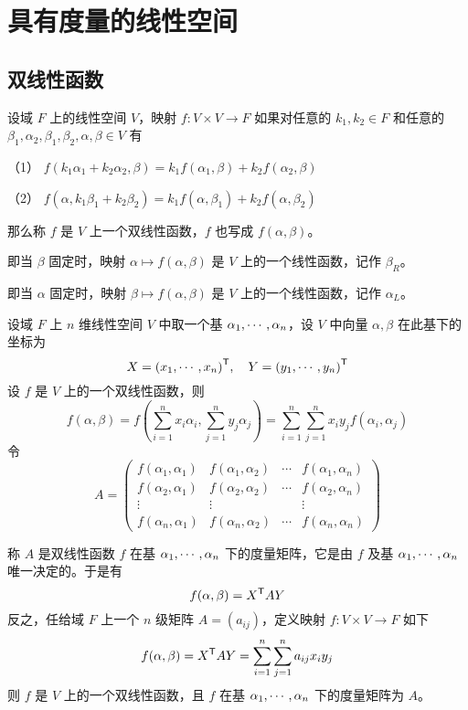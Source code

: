 \chapter{具有度量的线性空间}

\section{双线性函数}

\begin{definition}[双线性函数]
    设域 $F$ 上的线性空间 $V$，映射 $f : V \times V \to F$ 如果对任意的 $k_1,k_2 \in F$ 和任意的 $\beta_1,\alpha_2,\beta_1,\beta_2,\alpha,\beta \in V$ 有

    （1） $f(k_1\alpha_1 + k_2\alpha_2,\beta) = k_1 f(\alpha_1,\beta) + k_2f(\alpha_2,\beta)$

    （2） $f(\alpha,k_1\beta_1 + k_2\beta_2) = k_1 f(\alpha,\beta_1) + k_2f(\alpha,\beta_2)$

    那么称 $f$ 是 $V$ 上一个双线性函数，$f$ 也写成 $f(\alpha,\beta)$。
\end{definition}

即当 $\beta$ 固定时，映射 $\alpha \mapsto f(\alpha,\beta)$ 是 $V$ 上的一个线性函数，记作 $\beta_R$。

即当 $\alpha$ 固定时，映射 $\beta \mapsto f(\alpha,\beta)$ 是 $V$ 上的一个线性函数，记作 $\alpha_L$。

设域 $F$ 上 $n$ 维线性空间 $V$ 中取一个基 $\alpha_1,\cdots,\alpha_n$，设 $V$ 中向量 $\alpha,\beta$ 在此基下的坐标为
\[ X = {(x_1,\cdots,x_n)}^\mathsf{T}, \quad Y = {(y_1,\cdots,y_n)}^\mathsf{T} \]
设 $f$ 是 $V$ 上的一个双线性函数，则
\[ f(\alpha,\beta) = f\left( \sum_{i=1}^n x_i\alpha_i,\sum_{j=1}^ny_j\alpha_j \right) = \sum_{i=1}^n\sum_{j=1}^n x_iy_jf(\alpha_i,\alpha_j) \]
令
\[ A = \left(\begin{matrix}
    f(\alpha_1,\alpha_1) & f(\alpha_1,\alpha_2) & \cdots & f(\alpha_1,\alpha_n)\\
    f(\alpha_2,\alpha_1) & f(\alpha_2,\alpha_2) & \cdots & f(\alpha_2,\alpha_n)\\
    \vdots                 & \vdots                 &        & \vdots                \\
    f(\alpha_n,\alpha_1) & f(\alpha_n,\alpha_2) & \cdots & f(\alpha_n,\alpha_n)
\end{matrix}\right) \]

称 $A$ 是双线性函数 $f$ 在基 $\alpha_1,\cdots,\alpha_n$ 下的度量矩阵，它是由 $f$ 及基 $\alpha_1,\cdots,\alpha_n$ 唯一决定的。于是有
\[ f(\alpha,\beta) = {X}^\mathsf{T}AY \]
反之，任给域 $F$ 上一个 $n$ 级矩阵 $A = (a_{ij})$，定义映射 $f : V \times V \to F$ 如下
\[ f(\alpha,\beta) = {X}^\mathsf{T}AY = \sum_{i=1}^n\sum_{j=1}^na_{ij}x_iy_j \]
则 $f$ 是 $V$ 上的一个双线性函数，且 $f$ 在基 $\alpha_1,\cdots,\alpha_n$ 下的度量矩阵为 $A$。

